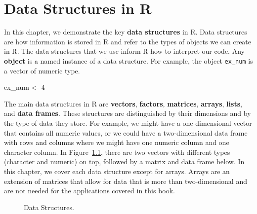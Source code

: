 \documentclass[
  letterpaper,
]{latex/krantz}
\makeatletter
\newenvironment{Shaded}{\begin{snugshade}}{\end{snugshade}}
\newcommand{\DecValTok}[1]{\textcolor[rgb]{0.68,0.00,0.00}{#1}}
\newcommand{\NormalTok}[1]{\textcolor[rgb]{0.00,0.23,0.31}{#1}}
\newcommand{\OtherTok}[1]{\textcolor[rgb]{0.00,0.23,0.31}{#1}}
\newenvironment{kframe}{%
\medskip{}
\setlength{\fboxsep}{.8em}
 \def\at@end@of@kframe{}%
 \ifinner\ifhmode%
  \def\at@end@of@kframe{\end{minipage}}%
  \begin{minipage}{\columnwidth}%
 \fi\fi%
 \def\FrameCommand##1{\hskip\@totalleftmargin \hskip-\fboxsep
 \colorbox{shadecolor}{##1}\hskip-\fboxsep
     \hskip-\linewidth \hskip-\@totalleftmargin \hskip\columnwidth}%
 \MakeFramed {\advance\hsize-\width
   \@totalleftmargin\z@ \linewidth\hsize
   \@setminipage}}%
 {\par\unskip\endMakeFramed%
 \at@end@of@kframe}
\renewenvironment{Shaded}{\begin{kframe}}{\end{kframe}}
\makeatother
\begin{document}
\chapter{Data Structures in R}\label{sec-data-structures}

In this chapter, we demonstrate the key \textbf{data
structures} in R. Data structures are how
information is stored in R and refer to the types of objects we can
create in R. The data structures that we use inform R how to interpret
our code. Any \textbf{object} is a named instance of a
data structure. For example, the object \texttt{ex\_num} is a vector of
numeric type.

\begin{Shaded}
\begin{Highlighting}[]
\NormalTok{ex\_num }\OtherTok{\textless{}{-}} \DecValTok{4}
\end{Highlighting}
\end{Shaded}

The main data structures in R are \textbf{vectors}, \textbf{factors},
\textbf{matrices}, \textbf{arrays}, \textbf{lists}, and \textbf{data
frames}. These structures are distinguished by their dimensions and by
the type of data they store. For example, we might have a
one-dimensional vector that contains all numeric values, or we could
have a two-dimensional data frame with rows and columns where we might
have one numeric column and one character column. In
Figure~\ref{fig-data-structures}, there are two vectors with different
types (character and numeric) on top, followed by a matrix and data
frame below. In this chapter, we cover each data structure except for
arrays. Arrays are an extension of matrices that allow for data that is
more than two-dimensional and are not needed for the applications
covered in this book.

\begin{figure}


\caption{\label{fig-data-structures}Data Structures.}

\end{figure}%
\end{document}
